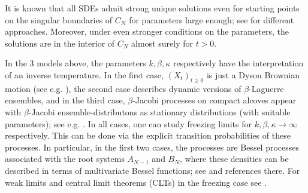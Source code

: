 \documentclass[reqno]{amsart}
\theoremstyle{plain}
\theoremstyle{definition}
\numberwithin{equation}{section}
\begin{document}
  It is 
  known that all SDEs admit strong unique solutions  even
  for starting points on the singular boundaries of $C_N$ for parameters  large enough;
  see \cite{AGZ, CGY, CL, De, GM, Sch1} for different approaches.
  Moreover, under even stronger conditions on the parameters,
  the solutions are in the interior of $C_N$ almost surely for $t>0$.

  In the 3 models above, the parameters $k,\beta,\kappa$ respectively have the interpretation of an inverse temperature.
  In the first case,    $(X_t)_{t\ge0}$ is just a Dyson Brownian motion (see e.g. \cite{AGZ}),
  the second case describes dynamic versions of $\beta$-Laguerre ensembles,
  and in the third case, $\beta$-Jacobi processes on compact alcoves appear
  with $\beta$-Jacobi ensemble-distributons as stationary distributions (with suitable parameters); see e.g. \cite{De, RR}.
  In all  cases, one can study freezing limits  for $k,\beta,\kappa\to \infty$
  respectively. This can be done  via the explicit transition probabilities of these processes.
  In particular, in the first two cases, the processes are Bessel processes associated with the root systems $A_{N-1}$ and $B_N$,
  where these densities can be described in terms of multivariate Bessel functions; see \cite{R1, RV1, V3} and references there.
  For weak limits and central limit theorems (CLTs) in the freezing case see
  \cite{AKM1, AKM2,AV1, AV2, CGY, DE2, R1, R2, RV1, V, V3}.
\end{document}
